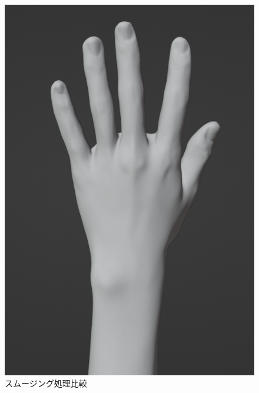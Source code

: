 \documentclass{ltjsreport}
\begin{document}
\begin{figure}[H]
\begin{minipage}{0.3\columnwidth}
			\end{minipage}
			\begin{minipage}{0.3\columnwidth}
			\centering
			\includegraphics[width = \columnwidth]{../figs/SmoothingAfterRear.png}
			\end{minipage}
			\caption{スムージング処理比較}
			\end{figure}
\end{document}
